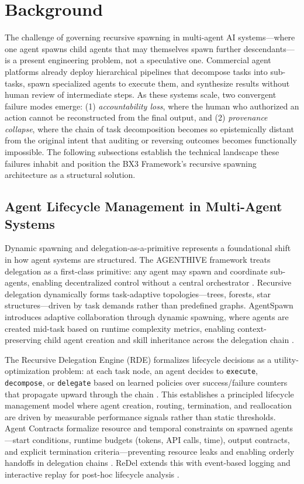\section{Background}
\label{sec:background}

The challenge of governing recursive spawning in multi-agent AI systems—where one agent spawns child agents that may themselves spawn further descendants—is a present engineering problem, not a speculative one. Commercial agent platforms already deploy hierarchical pipelines that decompose tasks into sub-tasks, spawn specialized agents to execute them, and synthesize results without human review of intermediate steps. As these systems scale, two convergent failure modes emerge: (1) \emph{accountability loss}, where the human who authorized an action cannot be reconstructed from the final output, and (2) \emph{provenance collapse}, where the chain of task decomposition becomes so epistemically distant from the original intent that auditing or reversing outcomes becomes functionally impossible. The following subsections establish the technical landscape these failures inhabit and position the BX3 Framework's recursive spawning architecture as a structural solution.

\subsection{Agent Lifecycle Management in Multi-Agent Systems}

Dynamic spawning and delegation-as-a-primitive represents a foundational shift in how agent systems are structured. The AGENTHIVE framework treats delegation as a first-class primitive: any agent may spawn and coordinate sub-agents, enabling decentralized control without a central orchestrator \cite{agenthive2025}. Recursive delegation dynamically forms task-adaptive topologies—trees, forests, star structures—driven by task demands rather than predefined graphs. AgentSpawn introduces adaptive collaboration through dynamic spawning, where agents are created mid-task based on runtime complexity metrics, enabling context-preserving child agent creation and skill inheritance across the delegation chain \cite{agentspawn2026}.

The Recursive Delegation Engine (RDE) formalizes lifecycle decisions as a utility-optimization problem: at each task node, an agent decides to \texttt{execute}, \texttt{decompose}, or \texttt{delegate} based on learned policies over success/failure counters that propagate upward through the chain \cite{rde2024}. This establishes a principled lifecycle management model where agent creation, routing, termination, and reallocation are driven by measurable performance signals rather than static thresholds. Agent Contracts formalize resource and temporal constraints on spawned agents—start conditions, runtime budgets (tokens, API calls, time), output contracts, and explicit termination criteria—preventing resource leaks and enabling orderly handoffs in delegation chains \cite{agentcontracts2025}. ReDel extends this with event-based logging and interactive replay for post-hoc lifecycle analysis \cite{redel2024}.

